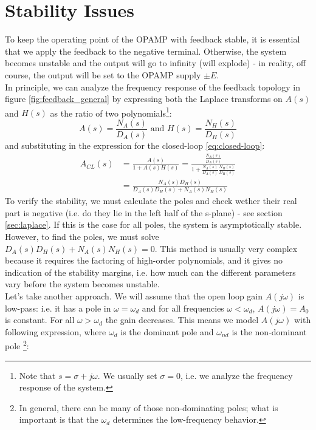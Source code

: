 

\section{Stability Issues}

To keep the operating point of the OPAMP with feedback stable, it is essential that we apply the feedback to the negative terminal. Otherwise, the system becomes unstable and the output will go to infinity (will explode) - in reality, off course, the output will be set to the OPAMP supply $\pm E$.\\
In principle, we can analyze the frequency response of the feedback topology in figure \ref{fig:feedback_general} by expressing both the Laplace transforms on  $A(s)$ and $H(s)$ as the ratio of two polynomials\footnote{Note that $s=\sigma + j \omega$. We usually set $\sigma=0$, i.e. we analyze the frequency response of the system.}:
$$
A(s) = \frac{N_A(s)}{D_A(s)} \text{ and }
H(s) = \frac{N_H(s)}{D_H(s)}
$$
and substituting in the expression for the closed-loop \ref{eq:closed-loop}:
\begin{align*}
	A_{CL}(s) &= \frac{A(s)}{1 + A(s) H(s)} = \frac{\frac{N_A(s)}{D_A(s)}}{1 + \frac{N_A(s)}{D_A(s)} \frac{N_H(s)}{D_H(s)}} \\
			  &= \frac{N_A(s) D_H(s)}{ D_A(s) D_H(s) + N_A(s)N_H(s)}
\end{align*}
To verify the stability, we must calculate the poles and check wether their real part is negative (i.e. do they lie in the left half of the s-plane) - see section \ref{sec:laplace}. If this is the case for all poles, the system is asymptotically stable. However, to find the poles, we must solve $D_A(s) D_H(s) + N_A(s)N_H(s) = 0$. This method is usually very complex because it requires the factoring of high-order polynomials, and it gives no indication of the stability margins, i.e. how much can the different parameters vary before the system becomes unstable.\\
Let's take another approach. We will assume that the open loop gain $A(j\omega)$ is low-pass: i.e. it has a pole in $\omega = \omega_d$ and for all frequencies $\omega <\omega_d$, $A(j \omega) = A_0$ is constant. For all $\omega > \omega_d$ the gain decreases. This means we model $A(j\omega)$ with following expression, where $\omega_d$ is the dominant pole and $\omega_{nd}$ is the non-dominant pole \footnote{In general, there can be many of those non-dominating poles; what is important is that the $\omega_d$ determines the low-frequency behavior.}:
